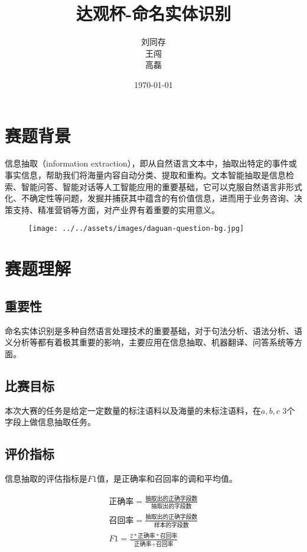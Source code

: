 \documentclass[9pt,aspectratio=169]{ctexbeamer}
\title{达观杯-命名实体识别}
\author{刘同存\\王闯\\高磊}
\date{\today}
\begin{document}
	
	\begin{frame}
		\titlepage
	\end{frame}
	\section{赛题背景}
	\begin{frame}
		信息抽取（information extraction），即从自然语言文本中，抽取出特定的事件或事实信息，帮助我们将海量内容自动分类、提取和重构。文本智能抽取是信息检索、智能问答、智能对话等人工智能应用的重要基础，它可以克服自然语言非形式化、不确定性等问题，发掘并捕获其中蕴含的有价值信息，进而用于业务咨询、决策支持、精准营销等方面，对产业界有着重要的实用意义。
		
		\begin{figure}
			\centering
			
			\texttt{[image: ../../assets/images/daguan-question-bg.jpg]}
		\end{figure}
	\end{frame}

	\section{赛题理解}
	\subsection{重要性}
	\begin{frame}
		
		命名实体识别是多种自然语言处理技术的重要基础，对于句法分析、语法分析、语义分析等都有着极其重要的影响，主要应用在信息抽取、机器翻译、问答系统等方面。
	
		
		
	\end{frame}
	\subsection{比赛目标}
	\begin{frame}
		本次大赛的任务是给定一定数量的标注语料以及海量的未标注语料，在$a,b,c$ 3个字段上做信息抽取任务。
	\end{frame}

\subsection{评价指标}
\begin{frame}
	信息抽取的评估指标是$F1$值，是正确率和召回率的调和平均值。
	
	\begin{gather*}
	\text{正确率} = \frac{\text{抽取出的正确字段数}}{\text{抽取出的字段数}} \\
	\text{召回率} = \frac{\text{抽取出的正确字段数}}{\text{样本的字段数}}\\
	F1 = \frac{2 * \text{正确率}*\text{召回率}}{\text{正确率}+\text{召回率}}
	\end{gather*}
\end{frame}
\end{document}
